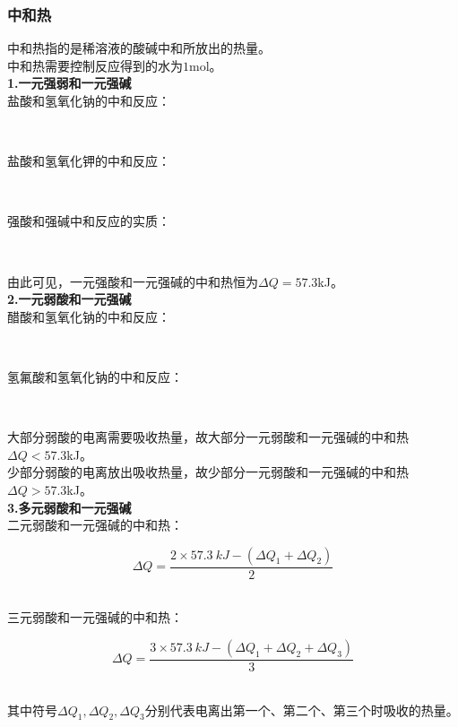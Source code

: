 \documentclass[UTF8]{ctexart}
\begin{document}
\newpage

\subsubsection{中和热}
    中和热指的是稀溶液的酸碱中和所放出的热量。\\[3mm]
    中和热需要控制反应得到的水为$1$\si{mol}。\\[3mm]
    \textbf{1.一元强弱和一元强碱}\\[3mm]
    盐酸和氢氧化钠的中和反应：
    \begin{center}
        \\[3mm]
    \end{center}
    盐酸和氢氧化钾的中和反应：
    \begin{center}
        \\[3mm]
    \end{center}
    强酸和强碱中和反应的实质：
    \begin{center}
        \\[3mm]
    \end{center}
    由此可见，一元强酸和一元强碱的中和热恒为$\Delta Q=57.3$\si{kJ}。\\[8mm]
    \textbf{2.一元弱酸和一元强碱}\\[3mm]
    醋酸和氢氧化钠的中和反应：
    \begin{center}
        \\[3mm]
    \end{center}
    氢氟酸和氢氧化钠的中和反应：
    \begin{center}
        \\[3mm]
    \end{center}
    大部分弱酸的电离需要吸收热量，故大部分一元弱酸和一元强碱的中和热$\Delta Q<57.3$\si{kJ}。\\[3mm]
    少部分弱酸的电离放出吸收热量，故少部分一元弱酸和一元强碱的中和热$\Delta Q>57.3$\si{kJ}。\\[8mm]
    \textbf{3.多元弱酸和一元强碱}\\[3mm]
    二元弱酸和一元强碱的中和热：
    \begin{large}
        \begin{equation*}
            \Delta Q=\frac{2\times 57.3~\si{kJ}-(\Delta Q_1+\Delta Q_2)}{2}
        \end{equation*}
    \end{large}\\
    三元弱酸和一元强碱的中和热：
    \begin{large}
        \begin{equation*}
            \Delta Q=\frac{3\times 57.3~\si{kJ}-(\Delta Q_1+\Delta Q_2+\Delta Q_3)}{3}
        \end{equation*}
    \end{large}\\
    其中符号$\Delta Q_1,\Delta Q_2,\Delta Q_3$分别代表电离出第一个、第二个、第三个时吸收的热量。
\end{document}
